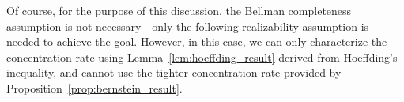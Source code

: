 \documentclass[twoside]{article}
\newtheorem{proposition}{Proposition}
\DeclareMathOperator*{\argmin}{arg\,min}
\newcommand{\CAL}[1]{\mathcal{#1}}
\newcommand{\zyh}[1]{{\color{blue}{ [\textbf{Youheng:}} #1]}}
\begin{document}
Of course, for the purpose of this discussion, the Bellman completeness assumption is not necessary—only the following realizability assumption is needed to achieve the goal. However, in this case, we can only characterize the concentration rate using Lemma~\ref{lem:hoeffding_result} derived from Hoeffding’s inequality, and cannot use the tighter concentration rate provided by Proposition~\ref{prop:bernstein_result}.

\end{document}
